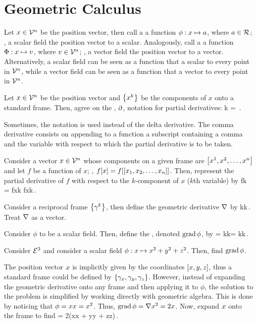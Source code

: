 \section{Geometric Calculus}

Let $x\in\mathcal{V}^{n}$ be the position vector, then call a  a function ${\phi}:{x}\mapsto{a}$, where $a\in\mathcal{R}$; \ie, a scalar field  the position vector to a scalar. Analogously, call a  a function ${\Phi}:{x}\mapsto{v}$, where $v\in\mathcal{V}^{n}$; \ie, a vector field  the position vector to a vector. Alternatively, a scalar field can be seen as a function that  a scalar to every point in $\mathcal{V}^{n}$, while a vector field can be seen as a function that  a vector to every point in $\mathcal{V}^{n}$.


Let $x\in\mathcal{V}^{n}$ be the position vector and $\left\lbrace{{x}^{k}}\right\rbrace$ be the components of $x$ onto a standard frame. Then, agree on the , $\partial_{}$, notation for partial derivatives:
\beq
\igder k =   {}\,.
\eeq

Sometimes, the  notation is used instead of the delta derivative. The comma derivative consists on appending to a function a subscript containing a comma and the variable with respect to which the partial derivative is to be taken.

\begin{example}
Consider a vector $x\in\mathcal{V}^{n}$ whose components on a given frame are $\left[{{x}^{1}, {x}^{2}, \dotsc, {x}^{n}}\right]$ and let $f$ be a function of $x$; \ie, $f\!\left[{x}\right] = f\!\left[{\left[{x_1, x_2, \dotsc, x_n}\right]}\right]$. Then, represent the partial derivative of $f$ with respect to the $k$-component of $x$ ($k$th variable) by
\beq
\cder fk = \cder f{\comp xk}  \xpd f{\comp xk}\,.\mqed
\eeq
\end{example}

Consider a reciprocal frame $\left\lbrace{\gamma^{k}}\right\rbrace$, then define the geometric derivative $\nabla$ by
\beq
\gder {} \rfvec k\igder k\,.
\eeq
Treat $\nabla$ as a vector.

Consider $\phi$ to be a scalar field. Then, define the , denoted $\operatorname{grad}\phi$, by
\beq
\grad\phi {} \gder\phi = \rfvec k\igder k\phi = \rfvec k\cder\phi k\,.
\eeq

\begin{example}
Consider $\mathcal{E}^{3}$ and consider a scalar field ${\phi}:{x}\mapsto{x^2 + y^2 + z^2}$. Then, find $\operatorname{grad}\phi$.
\end{example}
\begin{solution}
The position vector $x$ is implicitly given by the coordinates $\left[{x,y,z}\right]$, thus a standard frame could be defined by $\left\lbrace{\gamma_{x},\gamma_{y}, \gamma_{z}}\right\rbrace$. However, instead of expanding the geometric derivative onto any frame and then applying it to $\phi$, the solution to the problem is simplified by working directly with geometric algebra. This is done by noticing that $\phi = xx = x^2$. Thus, $\operatorname{grad}\phi = \nabla x^2 = 2x$. Now, expand $x$ onto the frame to find
\beq
\grad\phi = 2(x\rfvec x + y\rfvec y + z\rfvec z)\,.\mqed
\eeq
\end{solution}


